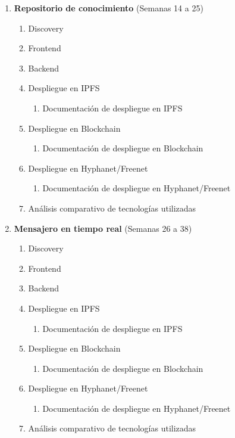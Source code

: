 \begin{enumerate}
    \item \textbf{Repositorio de conocimiento} (Semanas 14 a 25)
    \begin{enumerate}[label*=\arabic*.]
        \item Discovery
        \item Frontend
        \item Backend
        \item Despliegue en IPFS
        \begin{enumerate}[label*=\arabic*.]
            \item Documentación de despliegue en IPFS
        \end{enumerate}
        \item Despliegue en Blockchain
        \begin{enumerate}[label*=\arabic*.]
            \item Documentación de despliegue en Blockchain
        \end{enumerate}
        \item Despliegue en Hyphanet/Freenet
        \begin{enumerate}[label*=\arabic*.]
            \item Documentación de despliegue en Hyphanet/Freenet
        \end{enumerate}
        \item Análisis comparativo de tecnologías utilizadas
    \end{enumerate}
    
    \item \textbf{Mensajero en tiempo real} (Semanas 26 a 38)
    \begin{enumerate}[label*=\arabic*.]
        \item Discovery
        \item Frontend
        \item Backend
        \item Despliegue en IPFS
        \begin{enumerate}[label*=\arabic*.]
            \item Documentación de despliegue en IPFS
        \end{enumerate}
        \item Despliegue en Blockchain
        \begin{enumerate}[label*=\arabic*.]
            \item Documentación de despliegue en Blockchain
        \end{enumerate}
        \item Despliegue en Hyphanet/Freenet
        \begin{enumerate}[label*=\arabic*.]
            \item Documentación de despliegue en Hyphanet/Freenet
        \end{enumerate}
        \item Análisis comparativo de tecnologías utilizadas
    \end{enumerate}

\end{enumerate}
